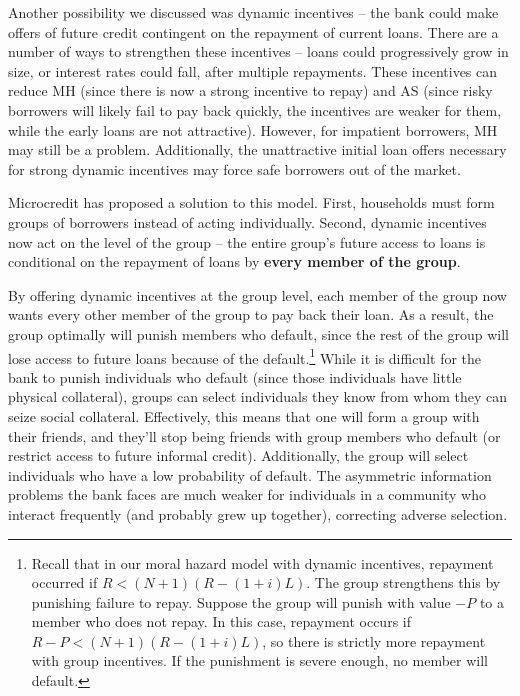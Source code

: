 \documentclass[12pt,english]{article}
\begin{document}
Another possibility we discussed was dynamic incentives -- the bank could make offers of future credit contingent on the repayment of current loans. There are a number of ways to strengthen these incentives -- loans could progressively grow in size, or interest rates could fall, after multiple repayments. These incentives can reduce MH (since there is now a strong incentive to repay) and AS (since risky borrowers will likely fail to pay back quickly, the incentives are weaker for them, while the early loans are not attractive). However, for impatient borrowers, MH may still be a problem. Additionally, the unattractive initial loan offers necessary for strong dynamic incentives may force safe borrowers out of the market.

Microcredit has proposed a solution to this model. First, households must form groups of borrowers instead of acting individually. Second, dynamic incentives now act on the level of the group -- the entire group's future access to loans is conditional on the repayment of loans by \textbf{every member of the group}.

By offering dynamic incentives at the group level, each member of the group now wants every other member of the group to pay back their loan. As a result, the group optimally will punish members who default, since the rest of the group will lose access to future loans because of the default.\footnote{Recall that in our moral hazard model with dynamic incentives, repayment occurred if $R < (N + 1)(R - (1 + i)L)$. The group strengthens this by punishing failure to repay. Suppose the group will punish with value $-P$ to a member who does not repay. In this case, repayment occurs if $R - P < (N+1)(R - (1 + i)L)$, so there is strictly more repayment with group incentives. If the punishment is severe enough, no member will default.} While it is difficult for the bank to punish individuals who default (since those individuals have little physical collateral), groups can select individuals they know from whom they can seize social collateral. Effectively, this means that one will form a group with their friends, and they'll stop being friends with group members who default (or restrict access to future informal credit). Additionally, the group will select individuals who have a low probability of default. The asymmetric information problems the bank faces are much weaker for individuals in a community who interact frequently (and probably grew up together), correcting adverse selection. 
\end{document}
